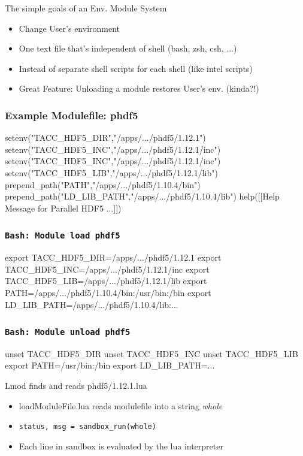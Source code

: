 \documentclass{beamer}
\begin{document}
\begin{frame}{The simple goals of an Env. Module System}
  \begin{itemize}
    \item Change User's environment
    \item One text file that's independent of shell (bash, zsh, csh, ...)
    \item Instead of separate shell scripts for each shell (like intel scripts)
    \item Great Feature: Unloading a module restores User's env. (kinda?!)
  \end{itemize}
\end{frame}

\begin{frame}[fragile]
  \frametitle{Example Modulefile: phdf5}
    {\tiny
\begin{semiverbatim}

setenv("TACC\_HDF5\_DIR","/apps/.../phdf5/1.12.1")
setenv("TACC\_HDF5\_INC","/apps/.../phdf5/1.12.1/inc")
setenv("TACC\_HDF5\_INC","/apps/.../phdf5/1.12.1/inc")
setenv("TACC\_HDF5\_LIB","/apps/.../phdf5/1.12.1/lib")
prepend\_path("PATH","/apps/.../phdf5/1.10.4/bin")
prepend\_path("LD\_LIB\_PATH","/apps/.../phdf5/1.10.4/lib")
help([[Help Message for Parallel HDF5 ...]])
\end{semiverbatim}
    }
\end{frame}

\begin{frame}[fragile]
  \frametitle{\texttt{Bash: Module load phdf5}}
    {\small
\begin{semiverbatim}
export TACC\_HDF5\_DIR=/apps/.../phdf5/1.12.1
export TACC\_HDF5\_INC=/apps/.../phdf5/1.12.1/inc
export TACC\_HDF5\_LIB=/apps/.../phdf5/1.12.1/lib
export PATH=/apps/.../phdf5/1.10.4/bin:/usr/bin:/bin
export LD\_LIB\_PATH=/apps/.../phdf5/1.10.4/lib:...
\end{semiverbatim}
    }
\end{frame}

\begin{frame}[fragile]
  \frametitle{\texttt{Bash: Module unload phdf5}}
    {\small
\begin{semiverbatim}
unset TACC\_HDF5\_DIR
unset TACC\_HDF5\_INC
unset TACC\_HDF5\_LIB
export PATH=/usr/bin:/bin
export LD\_LIB\_PATH=...
\end{semiverbatim}
    }
\end{frame}


\begin{frame}{Lmod finds and reads phdf5/1.12.1.lua}
  \begin{itemize}
    \item loadModuleFile.lua reads modulefile into a string \emph{whole}
    \item \texttt{status, msg = sandbox\_run(whole)}
    \item Each line in sandbox is evaluated by the lua interpreter
  \end{itemize}
\end{frame}
\end{document}
